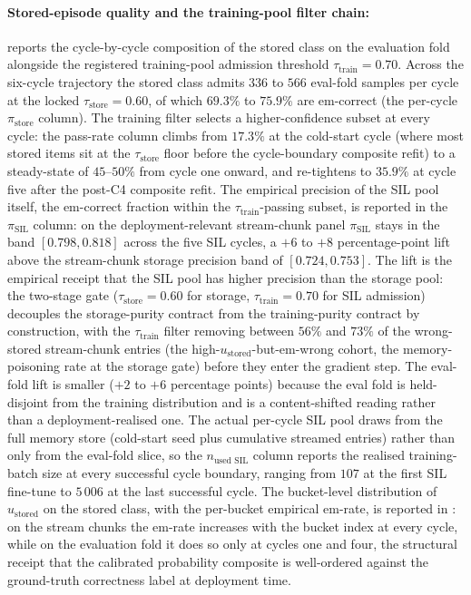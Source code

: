 \paragraph{Stored-episode quality and the training-pool filter chain:}  reports the cycle-by-cycle composition of the stored class on the evaluation fold alongside the registered training-pool admission threshold $\tau_{\text{train}} = 0.70$. Across the six-cycle trajectory the stored class admits $336$ to $566$ eval-fold samples per cycle at the locked $\tau_{\text{store}} = 0.60$, of which $69.3\%$ to $75.9\%$ are em-correct (the per-cycle $\pi_{\text{store}}$ column). The training filter selects a higher-confidence subset at every cycle: the pass-rate column climbs from $17.3\%$ at the cold-start cycle (where most stored items sit at the $\tau_{\text{store}}$ floor before the cycle-boundary composite refit) to a steady-state of $45$--$50\%$ from cycle one onward, and re-tightens to $35.9\%$ at cycle five after the post-C4 composite refit. The empirical precision of the SIL pool itself, the em-correct fraction within the $\tau_{\text{train}}$-passing subset, is reported in the $\pi_{\text{SIL}}$ column: on the deployment-relevant stream-chunk panel $\pi_{\text{SIL}}$ stays in the band $[0.798, 0.818]$ across the five SIL cycles, a $+6$ to $+8$ percentage-point lift above the stream-chunk storage precision band of $[0.724, 0.753]$. The lift is the empirical receipt that the SIL pool has higher precision than the storage pool: the two-stage gate ($\tau_{\text{store}} = 0.60$ for storage, $\tau_{\text{train}} = 0.70$ for SIL admission) decouples the storage-purity contract from the training-purity contract by construction, with the $\tau_{\text{train}}$ filter removing between $56\%$ and $73\%$ of the wrong-stored stream-chunk entries (the high-$u_{\text{stored}}$-but-em-wrong cohort, the memory-poisoning rate at the storage gate) before they enter the gradient step. The eval-fold lift is smaller ($+2$ to $+6$ percentage points) because the eval fold is held-disjoint from the training distribution and is a content-shifted reading rather than a deployment-realised one. The actual per-cycle SIL pool draws from the full memory store (cold-start seed plus cumulative streamed entries) rather than only from the eval-fold slice, so the $n_{\text{used SIL}}$ column reports the realised training-batch size at every successful cycle boundary, ranging from $107$ at the first SIL fine-tune to $5\,006$ at the last successful cycle. The bucket-level distribution of $u_{\text{stored}}$ on the stored class, with the per-bucket empirical em-rate, is reported in : on the stream chunks the em-rate increases with the bucket index at every cycle, while on the evaluation fold it does so only at cycles one and four, the structural receipt that the calibrated probability composite is well-ordered against the ground-truth correctness label at deployment time.

